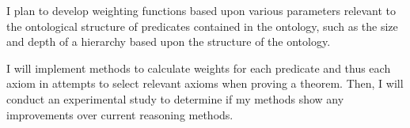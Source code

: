 \documentclass{article}
\begin{document}
I plan to develop weighting functions based upon various parameters relevant to the ontological structure of predicates contained in the ontology, such as the size and depth of a hierarchy based upon the structure of the ontology. 

I will implement methods to calculate weights for each predicate and thus each axiom in attempts to select relevant axioms when proving a theorem. Then, I will conduct an experimental study to determine if my methods show any improvements over current reasoning methods. 


\nocite{*}

\printbibliography
\end{document}
